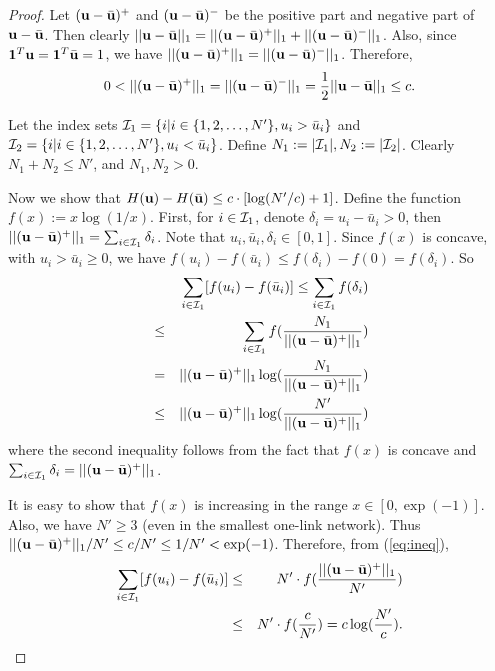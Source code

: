 \documentclass{IEEEtran}
\begin{document}
\begin{proof}
Let $({\bf u}-\bar{{\bf u}})^{+}$ and $({\bf u}-\bar{{\bf u}})^{-}$
be the positive part and negative part of ${\bf u}-\bar{{\bf u}}$.
Then clearly $||{\bf u}-\bar{{\bf u}}||_{1}=||({\bf u}-\bar{{\bf u}})^{+}||_{1}+||({\bf u}-\bar{{\bf u}})^{-}||_{1}$.
Also, since ${\bf 1}^{T}{\bf u}={\bf 1}^{T}\bar{{\bf u}}=1$, we have
$||({\bf u}-\bar{{\bf u}})^{+}||_{1}=||({\bf u}-\bar{{\bf u}})^{-}||_{1}$.
Therefore, \[
0<||({\bf u}-\bar{{\bf u}})^{+}||_{1}=||({\bf u}-\bar{{\bf u}})^{-}||_{1}=\frac{1}{2}||{\bf u}-\bar{{\bf u}}||_{1}\le c.\]


Let the index sets ${\cal I}_{1}=\{i|i\in\{1,2,\dots,N'\},u_{i}>\bar{u}_{i}\}$
and ${\cal I}_{2}=\{i|i\in\{1,2,\dots,N'\},u_{i}<\bar{u}_{i}\}$.
Define $N_{1}:=|{\cal I}_{1}|,N_{2}:=|{\cal I}_{2}|$. Clearly $N_{1}+N_{2}\le N'$,
and $N_{1},N_{2}>0$. 

Now we show that $H({\bf u})-H(\bar{{\bf u}})\le c\cdot[\log(N'/c)+1]$.
Define the function $f(x):=x\log(1/x)$. First, for $i\in{\cal I}_{1}$,
denote $\delta_{i}=u_{i}-\bar{u}_{i}>0$, then $||({\bf u}-\bar{{\bf u}})^{+}||_{1}=\sum_{i\in{\cal I}_{1}}\delta_{i}$.
Note that $u_{i},\bar{u}_{i},\delta_{i}\in[0,1]$. Since $f(x)$ is
concave, with $u_{i}>\bar{u}_{i}\ge0$, we have $f(u_{i})-f(\bar{u}_{i})\le f(\delta_{i})-f(0)=f(\delta_{i})$.
So\begin{eqnarray}
 &  & \sum_{i\in{\cal I}_{1}}[f(u_{i})-f(\bar{u}_{i})]\le\sum_{i\in{\cal I}_{1}}f(\delta_{i})\nonumber \\
 & \le & \sum_{i\in{\cal I}_{1}}f(\frac{N_{1}}{||({\bf u}-\bar{{\bf u}})^{+}||_{1}})\nonumber \\
 & = & ||({\bf u}-\bar{{\bf u}})^{+}||_{1}\log(\frac{N_{1}}{||({\bf u}-\bar{{\bf u}})^{+}||_{1}})\nonumber \\
 & \le & ||({\bf u}-\bar{{\bf u}})^{+}||_{1}\log(\frac{N'}{||({\bf u}-\bar{{\bf u}})^{+}||_{1}})\label{eq:ineq}\end{eqnarray}
where the second inequality follows from the fact that $f(x)$ is
concave and $\sum_{i\in{\cal I}_{1}}\delta_{i}=||({\bf u}-\bar{{\bf u}})^{+}||_{1}$.

It is easy to show that $f(x)$ is increasing in the range $x\in[0,\exp(-1)]$.
Also, we have $N'\ge3$ (even in the smallest one-link network). Thus
$||({\bf u}-\bar{{\bf u}})^{+}||_{1}/N'\le c/N'\le1/N'<\exp(-1)$.
Therefore, from (\ref{eq:ineq}),\begin{eqnarray}
\sum_{i\in{\cal I}_{1}}[f(u_{i})-f(\bar{u}_{i})] & \le & N'\cdot f(\frac{||({\bf u}-\bar{{\bf u}})^{+}||_{1}}{N'})\nonumber \\
 & \le & N'\cdot f(\frac{c}{N'})=c\log(\frac{N'}{c}).\label{eq:positive-part}\end{eqnarray}



\end{proof}
\end{document}
